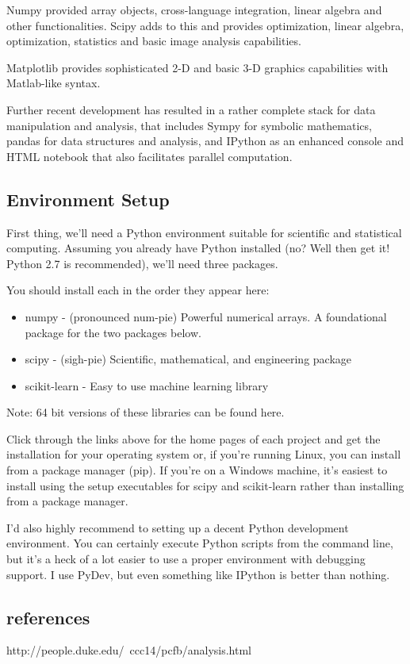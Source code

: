 Numpy provided array objects, cross-language integration, linear algebra and other functionalities. 
Scipy adds to this and provides optimization, linear algebra, optimization, statistics and basic image analysis 
capabilities. 

Matplotlib provides sophisticated 2-D and basic 3-D graphics capabilities with Matlab-like syntax.


Further recent development has resulted in a rather complete stack for data manipulation and analysis, that includes Sympy for symbolic mathematics, pandas for data structures and analysis, and IPython as an enhanced console and HTML notebook that also facilitates parallel computation.



\subsection*{Environment Setup}

First thing, we'll need a Python environment suitable for scientific and statistical computing. Assuming you already have Python installed (no? Well then get it! Python 2.7 is recommended), we'll need three packages. 

You should install each in the order they appear here:

\begin{itemize}
\item numpy - (pronounced num-pie) Powerful numerical arrays. A foundational package for the two packages below.
\item scipy - (sigh-pie) Scientific, mathematical, and engineering package
\item scikit-learn - Easy to use machine learning library
\end{itemize}

Note: 64 bit versions of these libraries can be found here.

Click through the links above for the home pages of each project and get the installation for your operating system or, if you're running Linux, you can install from a package manager (pip). If you're on a Windows machine, it's easiest to install using the setup executables for scipy and scikit-learn rather than installing from a package manager.

I'd also highly recommend to setting up a decent Python development environment. You can certainly execute Python scripts from the command line, but it's a heck of a lot easier to use a proper environment with debugging support. I use PyDev, but even something like IPython is better than nothing.


\subsection*{references}
http://people.duke.edu/~ccc14/pcfb/analysis.html

